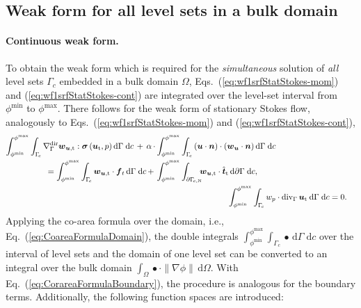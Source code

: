 \documentclass[12pt, twoside, english]{article}
\numberwithin{equation}{section}
\newcommand{\vek}[1]{\mathchoice{\displaystyle\boldsymbol#1}
{\textstyle\boldsymbol#1}{\scriptstyle\boldsymbol#1}
{\scriptscriptstyle\boldsymbol#1}}
\newcommand{\ti}{ \ensuremath{\mathrm{t} }}
\begin{document}
\subsection{Weak form for all level sets in a bulk domain}\label{subsec:StStok-wfEqAllLS}

\paragraph{Continuous weak form.} To obtain the weak form which is required for the \emph{simultaneous} solution of \emph{all} level sets $\Gamma_{\!c}$ embedded in a bulk domain $\Omega$, Eqs.~(\ref{eq:wf1srfStatStokes-mom}) and (\ref{eq:wf1srfStatStokes-cont}) are integrated over the level-set interval from $\phi^{\min}$ to $\phi^{\max}$. There follows for the weak form of stationary Stokes flow, analogously to Eqs.~(\ref{eq:wf1srfStatStokes-mom}) and (\ref{eq:wf1srfStatStokes-cont}),
\begin{align}
	\begin{split}
		\int_{\phi^{\min}}^{\phi^{\max}}\int_{\Gamma_{\!c}}\nabla_{\Gamma}^{\mathrm{dir}}\vek{w}_{\vek{u},\ti}:\vek{\sigma}\left(\vek{u}_\ti,p\right)\mathrm{d}\Gamma\;\mathrm{d}c\,+\,\alpha\,\cdot & \int_{\phi^{\min}}^{\phi^{\max}}\int_{\Gamma_{\!c}} \left(\vek{u} \cdot \vek{n} \right) \cdot \left(\vek{w}_{\boldsymbol{u}} \cdot \vek{n} \right) \mathrm{d}\Gamma\;\mathrm{d}c \\ = \int_{\phi^{\min}}^{\phi^{\max}}\int_{\Gamma_{\!c}}\vek{w}_{\vek{u},\ti}\cdot\vek{f}_t\,\mathrm{d}\Gamma\;\mathrm{d}c\,+\, &\int_{\phi^{\min}}^{\phi^{\max}}\int_{\partial\Gamma_{\!c,\mathrm{N}}}\!\!\!\vek{w}_{\vek{u},\ti}\cdot\hat{\vek{t}}_\ti\,\mathrm{d}\partial\Gamma\;\mathrm{d}c,\label{eq:wfBTF2IntStatStokes-mom}
	\end{split}\\
	\int_{\phi^{\min}}^{\phi^{\max}}\int_{\Gamma_{\!c}}w_{p} & \cdot\mathrm{div}_{\Gamma}\,\vek{u}_\ti\:\mathrm{d}\Gamma\;\mathrm{d}c = 0.\label{eq:wfBTF2IntStatStokes-cont}
\end{align}
Applying the co-area formula over the domain, i.e., Eq.~(\ref{eq:CoareaFormulaDomain}), the double integrals $\int_{\phi^{\min}}^{\phi^{\max}}\int_{\Gamma_{\!c}} \bullet \,\mathrm{d}\Gamma\;\mathrm{d}c$ over the interval of level sets and the domain of one level set can be converted to an integral over the bulk domain $\int_{\Omega} \bullet \cdot \lVert \nabla \phi \rVert\,\mathrm{d}\Omega$. With Eq.~(\ref{eq:CorareaFormulaBoundary}), the procedure is analogous for the boundary terms. Additionally, the following function spaces are introduced:
\end{document}

